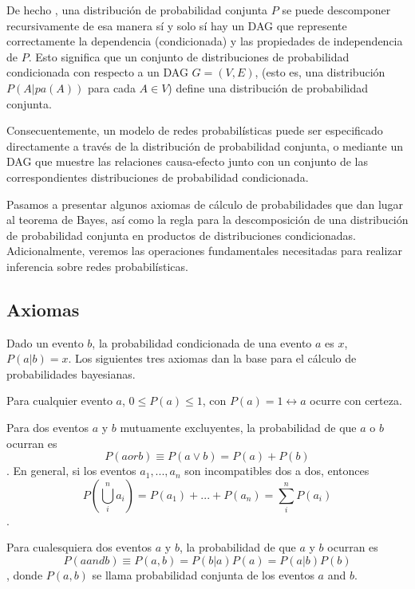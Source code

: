 De hecho , una distribución de probabilidad conjunta $P$ se puede descomponer recursivamente de esa manera sí y solo sí 
hay un DAG que represente correctamente la dependencia (condicionada) y las propiedades de independencia de $P$. Esto 
significa que un conjunto de distribuciones de probabilidad condicionada con respecto a un DAG $G=(V,E)$, (esto es, 
una distribución $P(A|pa(A))$ para cada $A \in V$) define una distribución de probabilidad conjunta.

Consecuentemente, un modelo de redes probabilísticas puede ser especificado directamente a través de la distribución 
de probabilidad conjunta, o mediante un DAG que muestre las relaciones causa-efecto junto con un conjunto de 
las correspondientes distribuciones de probabilidad condicionada.

Pasamos a presentar algunos axiomas de cálculo de probabilidades que dan lugar al teorema de Bayes, así como 
la regla para la descomposición de una distribución de probabilidad conjunta en productos de distribuciones 
condicionadas. Adicionalmente, veremos las operaciones fundamentales necesitadas para realizar inferencia 
sobre redes probabilísticas.

\subsection{Axiomas} 
Dado un evento $b$, la probabilidad condicionada de una evento $a$ es $x$, $P(a|b) = x$.
Los siguientes tres axiomas dan la base para el cálculo de probabilidades bayesianas.
\begin{axioma} 
Para cualquier evento $a$, $0 \leq P(a) \leq 1$, con $P(a)=1 \leftrightarrow a$ ocurre con certeza.
\end{axioma}

\begin{axioma}
Para dos eventos $a$ y $b$ mutuamente excluyentes, la probabilidad de que $a$ o $b$ ocurran es 
$$P(a or b) \equiv P(a \vee b)= P(a) + P(b)$$.
En general, si los eventos $a_{1},...,a_{n}$ son incompatibles dos a dos, entonces 
$$P(\bigcup_{i}^{n} a_{i})= P(a_{1}) + ... + P(a_{n}) = \sum_{i}^{n} P(a_{i})$$.
\end{axioma}

\begin{axioma}
Para cualesquiera dos eventos $a$ y $b$, la probabilidad de que $a$ y $b$ ocurran es 
$$P(a and b) \equiv P(a,b) = P(b|a)P(a) = P(a|b)P(b)$$, 
donde $P(a,b)$ se llama probabilidad conjunta de los eventos $a$ and $b$.
\end{axioma}

